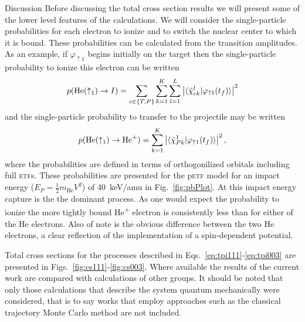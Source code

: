\documentclass[aps, pra, reprint, groupedaddress, amsfonts, longbibliography,
               amsmath, amssymb, showpacs, nofootinbib]{revtex4-1}
\begin{document}
\begin{section}{Discussion \label{sec:disc}}
   Before discussing the total cross section results we will present some of the lower level features of
   the calculations. We will consider the single-particle probabilities for each electron to ionize and
   to switch the nuclear center to which it is bound. These probabilities can be calculated from the
   transition amplitudes. As an example, if $\varphi_{\uparrow 1}$ begins initially on the target then
   the single-particle probability to ionize this electron can be written
   \begin{equation} \label{eq:ionprob}
      p(\mathrm{He}(\uparrow_1) \rightarrow I ) =
         \sum\limits_{c \in \{T,P\}} \sum\limits_{k=1}^K \sum\limits_{l = 1}^L
         \left| \braket{ \tilde{\chi}^{l}_{c k} | \varphi_{\uparrow 1}(t_f)} \right|^2
   \end{equation}
   and the single-particle probability to transfer to the projectile may be written
   \begin{equation} \label{eq:transprob}
      p(\mathrm{He}(\uparrow_1) \rightarrow \mathrm{He}^+) =
         \sum\limits_{k=1}^K \left| \braket{ \tilde{\chi}^{1}_{P k} | \varphi_{\uparrow 1}(t_f)}
                             \right|^2,
   \end{equation}
   where the probabilities are defined in terms of orthogonilized orbitals including full \textsc{etf}s.
   These probabilities are presented for the p\textsc{etf} model for an impact energy ($E_P =
   \frac{1}{2} m_\textrm{He} V^2$) of 40~keV/amu in Fig.~\ref{fig:pbPlot}. At this impact energy
   capture is the the dominant process. As one would expect the probability to ionize the more tightly
   bound He\textsuperscript{+} electron is consistently less than for either of the He electrons. Also
   of note is the obvious difference between the two He electrons, a clear reflection of the
   implementation of a spin-dependent potential.

   Total cross sections for the processes described in
   Eqs.~\eqref{eq:tpi111}-\eqref{eq:tpi003} are presented in Figs.~\ref{fig:cs111}-\ref{fig:cs003}.
   Where available the results of the current work are compared with calculations of other groups. It
   should be noted that only those calculations that describe the system quantum mechanically were
   considered, that is to say works that employ approaches such as the classical trajectory Monte Carlo
   method are not included.


\end{section}
\end{document}
